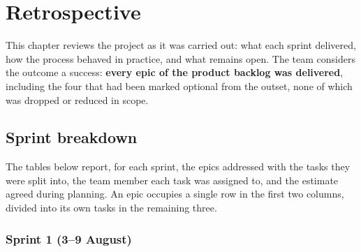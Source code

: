 \chapter{Retrospective}

This chapter reviews the project as it was carried out: what each sprint delivered, how the process behaved in
practice, and what remains open. The team considers the outcome a success: \textbf{every epic of the product backlog
was delivered}, including the four that had been marked optional from the outset, none of which was dropped or reduced
in scope.

\section{Sprint breakdown}

The tables below report, for each sprint, the epics addressed with the tasks they were split into, the team member each
task was assigned to, and the estimate agreed during planning. An epic occupies a single row in the first two columns,
divided into its own tasks in the remaining three.

\subsection*{Sprint 1 (3--9 August)}

